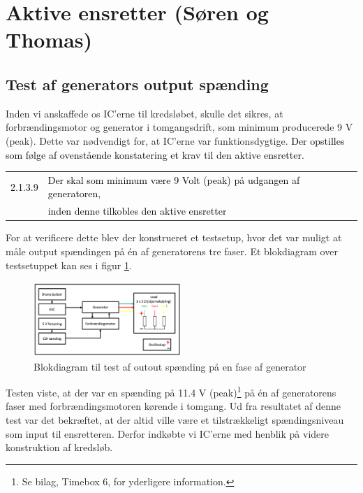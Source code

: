 \section{Aktive ensretter (Søren og Thomas)}
\label{sec:aktive-ensr-soren}

\subsection{Test af generators output spænding}
\label{sec:test-af-generators}

Inden vi anskaffede os IC’erne til kredsløbet, skulle det sikres, at forbrændingsmotor og generator i tomgangsdrift, som minimum producerede 9 V (peak). Dette var nødvendigt for, at IC’erne var funktionsdygtige. \textcolor{black}{Der opstilles som følge af ovenstående konstatering et krav til den aktive ensretter.}

\begin{tabular}{p{1cm}l}
  \textcolor{black}{2.1.3.9}&\textcolor{black}{Der skal som minimum være 9 Volt (peak) på udgangen af generatoren,}\\
  & \textcolor{black}{inden denne tilkobles den aktive ensretter}
\end{tabular}

For at verificere dette blev der konstrueret et testsetup, hvor det var muligt at måle output spændingen på én af generatorens tre faser. Et blokdiagram over testsetuppet kan ses i figur \ref{fig:prens5}.

\begin{figure}[h]
  \centering
  \includegraphics[width=0.5\textwidth]{./figurer/prens5.png}
  \caption{Blokdiagram til test af outout spænding på en fase af generator}
  \label{fig:prens5}
\end{figure}

Testen viste, at der var en spænding på 11.4 V (peak)\footnote{Se bilag, Timebox 6, for yderligere information.} på én af generatorens faser med forbrændingsmotoren kørende i tomgang. Ud fra resultatet af denne test var det bekræftet, at der altid ville være et tilstrækkeligt spændingsniveau som input til ensretteren. Derfor indkøbte vi IC’erne med henblik på videre konstruktion af kredsløb.

